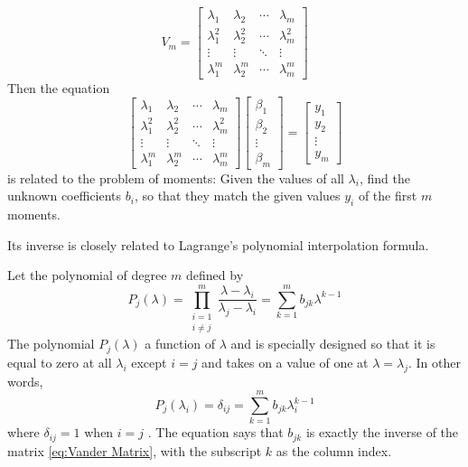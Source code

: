 \begin{equation}
V_{m}=\left[\begin{array}{cccc}
\lambda_{1} & \lambda_{2} & \cdots & \lambda_{m}\\
\lambda_{1}^{2} & \lambda_{2}^{2} & \cdots & \lambda_{m}^{2}\\
\vdots & \vdots & \ddots & \vdots\\
\lambda_{1}^{m} & \lambda_{2}^{m} & \cdots & \lambda_{m}^{m}
\end{array}\right]\label{eq:Vander Matrix}
\end{equation}
Then the equation 
\begin{equation}
\left[\begin{array}{cccc}
\lambda_{1} & \lambda_{2} & \cdots & \lambda_{m}\\
\lambda_{1}^{2} & \lambda_{2}^{2} & \cdots & \lambda_{m}^{2}\\
\vdots & \vdots & \ddots & \vdots\\
\lambda_{1}^{m} & \lambda_{2}^{m} & \cdots & \lambda_{m}^{m}
\end{array}\right]\left[\begin{array}{c}
\beta_{1}\\
\beta_{2}\\
\vdots\\
\beta_{m}
\end{array}\right]=\left[\begin{array}{c}
y_{1}\\
y_{2}\\
\vdots\\
y_{m}
\end{array}\right]\label{eq:Vander Eq.}
\end{equation}
is related to the problem of moments: Given the values of all $\lambda_{i}$,
find the unknown coefficients $b_{i}$, so that they match the given
values $y_{i}$ of the first $m$ moments. 

Its inverse is closely related to Lagrange's polynomial interpolation
formula. 

Let the polynomial of degree $m$ defined by 
\begin{equation}
P_{j}\left(\lambda\right)=\prod_{\begin{array}{c}
i=1\\
i\neq j
\end{array}}^{m}\frac{\lambda-\lambda_{i}}{\lambda_{j}-\lambda_{i}}=\sum_{k=1}^{m}b_{jk}\lambda^{k-1}\label{eq:Lagrange's polynomial}
\end{equation}
The polynomial $P_{j}\left(\lambda\right)$ a function of $\lambda$
and is specially designed so that it is equal to zero at all $\lambda_{i}$
except $i=j$ and takes on a value of one at $\lambda=\lambda_{j}$.
In other words, 
\[
P_{j}\left(\lambda_{i}\right)=\delta_{ij}=\sum_{k=1}^{m}b_{jk}\lambda_{i}^{k-1}
\]
where $\delta_{ij}=1$ when $i=j$ . The equation says that $b_{jk}$
is exactly the inverse of the matrix \eqref{eq:Vander Matrix}, with
the subscript $k$ as the column index. 

